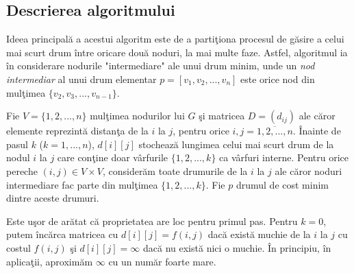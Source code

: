 \documentclass[11pt,a4paper]{report}
\begin{document}
    \subsection{Descrierea algoritmului}
    
    Ideea principal\u a a acestui algoritm este de a parti\c tiona procesul de g\u asire a celui mai scurt drum \^ intre oricare dou\u a noduri, la mai multe faze. Astfel, algoritmul ia \^ in considerare nodurile "intermediare" ale unui drum minim, unde un \textit{nod intermediar} al unui drum elementar $p=[v_1,v_2,...,v_n]$ este orice nod din mul\c timea $\{v_2,v_3,...,v_{n-1}\}$.
    
    Fie $V=\{1,2,...,n\}$ mul\c timea nodurilor lui $G$ \c si matricea $D=(d_{ij})$ ale c\u aror elemente reprezint\u a distan\c ta de la $i$ la $j$, pentru orice $i,j=\overline{1,2,...,n}$. \^ Inainte de pasul $k$ ($k=1,...,n$), $d[i][j]$ stocheaz\u a lungimea celui mai scurt drum de la nodul $i$ la $j$ care con\c tine doar v\^ arfurile $\{1,2,...,k\}$ ca v\^ arfuri interne. Pentru orice pereche $(i,j)\in V\times V$, consider\u am toate drumurile de la $i$ la $j$ ale c\u aror noduri intermediare fac parte din mul\c timea $\{1,2,...,k\}$. Fie $p$ drumul de cost minim dintre aceste drumuri.
    
    Este u\c sor de ar\u atat c\u a proprietatea are loc pentru primul pas. Pentru $k=0$, putem \^ inc\u arca matricea cu $d[i][j]=f(i,j)$ dac\u a exist\u a muchie de la $i$ la $j$ cu costul $f(i,j)$ \c si $d[i][j]=\infty$ dac\u a nu exist\u a nici o muchie. \^ In principiu, \^ in aplica\c tii, aproxim\u am $\infty$ cu un num\u ar foarte mare.
    
\end{document}

